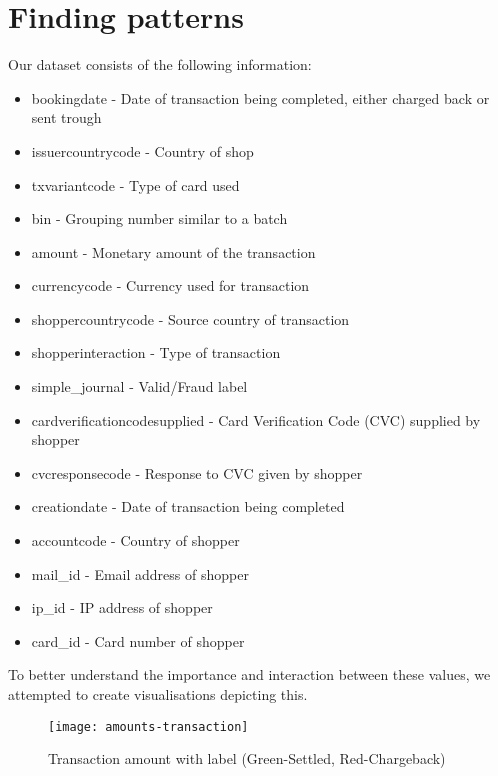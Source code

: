 \section*{Finding patterns}

Our dataset consists of the following information:

\begin{itemize}
	\setlength\itemsep{0.05em}
	\item bookingdate - Date of transaction being completed, either charged back or sent trough
	\item issuercountrycode - Country of shop
	\item txvariantcode - Type of card used
	\item bin - Grouping number similar to a batch
	\item amount - Monetary amount of the transaction
	\item currencycode - Currency used for transaction
	\item shoppercountrycode - Source country of transaction
	\item shopperinteraction - Type of transaction
	\item simple\_journal - Valid/Fraud label
	\item cardverificationcodesupplied - Card Verification Code (CVC) supplied by shopper
	\item cvcresponsecode - Response to CVC given by shopper
	\item creationdate - Date of transaction being completed
	\item accountcode - Country of shopper
	\item mail\_id - Email address of shopper
	\item ip\_id - IP address of shopper
	\item card\_id - Card number of shopper
\end{itemize}

To better understand the importance and interaction between these values, we attempted to create visualisations depicting this.

\begin{figure}
	\centering
	\caption{Transaction amount with label (Green-Settled, Red-Chargeback)}
	\label{img-amounts}
	\texttt{[image: amounts-transaction]}
\end{figure}